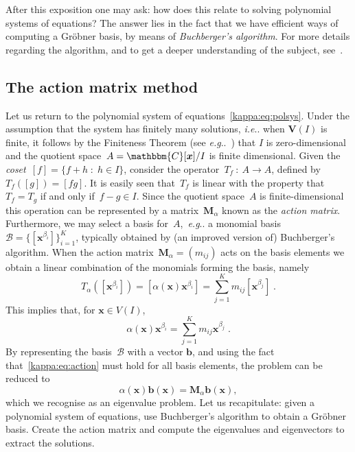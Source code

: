 \documentclass[11pt,a4paper]{article}
\makeatletter
\theoremstyle{definition}
\newcommand{\mat}[1]{\bm{#1}}
\newcommand{\C}{\ensuremath{\mathbbm{C}}}
\DeclareRobustCommand\eg{\emph{e.g}\@ifnextchar.{}{.\@}}
\DeclareRobustCommand\ie{\emph{i.e}\@ifnextchar.{}{.\@}}
\makeatother
\begin{document}
After this exposition one may ask: how does this relate to solving polynomial systems
of equations? The answer lies in the fact that we have efficient ways of computing
a Gröbner basis, by means of \emph{Buchberger's algorithm}.
For more details regarding the algorithm, and to get a deeper understanding of the subject,
see~\cite{cox,cox2}.

\subsection{The action matrix method}\label{kappa:sec:actionmatrix}
Let us return to the polynomial system of equations~\eqref{kappa:eq:polsys}. Under the
assumption that the system has finitely many solutions, \ie{} when $\mat{V}(I)$ is finite,
it follows by the Finiteness Theorem (see \eg{}~\cite{cox2}) that $I$ is
zero-dimensional and the quotient space~\mbox{$A=\C[\mat{x}]/I$} is
finite dimensional. Given the \emph{coset}~$[f] = \{f+h\;:\;h\in I\}$,
consider the operator~\mbox{$T_f\::\:A\longrightarrow A$}, defined by~$T_f([g])=[fg]$.
It is easily seen that~$T_f$ is
linear with the property that~$T_f=T_g$ if and only if~$f-g\in I$.
Since the quotient space~$A$ is finite-dimensional this operation can be
represented by a matrix~$\mat{M}_\alpha$ known as the \emph{action matrix}.
Furthermore, we may select a basis for~$A$,~\eg{} a monomial
basis~$\mathcal{B}=\{[\mat{x}^{\beta_i}]\}_{i=1}^K$,
typically obtained by (an improved version of)
Buchberger's algorithm.
When the action matrix~$\mat{M}_\alpha=(m_{ij})$ acts on the basis elements we obtain a
linear combination of the monomials forming the basis, namely
\begin{equation}
    T_\alpha([\mat{x}^{\beta_i}]) = [\alpha(\mat{x})\mat{x}^{\beta_i}] = \sum_{j=1}^Km_{ij}[\mat{x}^{\beta_j}]\;.
\end{equation}
This implies that,
for $\mat{x}\in V(I)$,
\begin{equation}\label{kappa:eq:action}
    \alpha(\mat{x})\mat{x}^{\beta_i}=\sum_{j=1}^Km_{ij}\mat{x}^{\beta_j}\;.
\end{equation}
By representing the basis~$\mathcal{B}$ with a vector $\mat{b}$, and using the fact
that~\eqref{kappa:eq:action} must hold for all basis elements, the problem can be reduced to
\begin{equation}\label{eq:actionmat}
    \alpha(\mat{x})\mat{b}(\mat{x}) = \mat{M}_\alpha\mat{b}(\mat{x}),
\end{equation}
which we recognise as an eigenvalue problem.
Let us recapitulate: given a polynomial
system of equations, use Buchberger's algorithm to obtain a Gröbner basis. Create the
action matrix and compute the eigenvalues and eigenvectors to extract the solutions.
\end{document}
